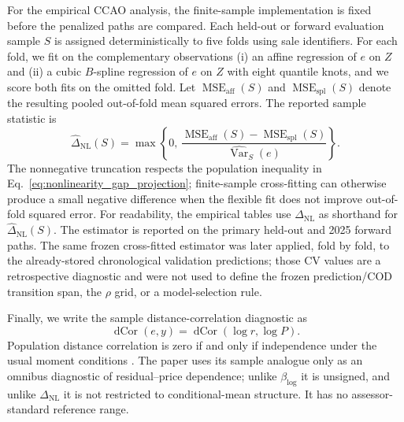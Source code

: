 \documentclass[10pt]{article}
\theoremstyle{definition}
\newcommand{\Var}{\operatorname{Var}}
\newcommand{\1}{\mathbf{1}}
\begin{document}
For the empirical CCAO analysis, the finite-sample implementation is fixed before
the penalized paths are compared. Each held-out or forward evaluation sample $S$ is
assigned deterministically to five folds using sale identifiers. For each fold, we
fit on the complementary observations (i) an affine regression of $e$ on $Z$ and
(ii) a cubic $B$-spline regression of $e$ on $Z$ with eight quantile knots, and we
score both fits on the omitted fold. Let
$\operatorname{MSE}_{\mathrm{aff}}(S)$ and
$\operatorname{MSE}_{\mathrm{spl}}(S)$ denote the resulting pooled out-of-fold mean
squared errors. The reported sample statistic is
\begin{equation}
\label{eq:nonlinearity_gap_estimator}
\widehat{\Delta}_{\mathrm{NL}}(S)
=
\max\left\{
0,\,
\frac{
\operatorname{MSE}_{\mathrm{aff}}(S)
-
\operatorname{MSE}_{\mathrm{spl}}(S)
}{
\widehat{\Var}_S(e)
}
\right\}.
\end{equation}
The nonnegative truncation respects the population inequality in
Eq.~\eqref{eq:nonlinearity_gap_projection}; finite-sample cross-fitting can otherwise
produce a small negative difference when the flexible fit does not improve
out-of-fold squared error. For readability, the empirical tables use
$\Delta_{\mathrm{NL}}$ as shorthand for
$\widehat{\Delta}_{\mathrm{NL}}(S)$. 
The estimator is reported on the primary held-out and 2025 forward paths. The same frozen cross-fitted estimator was later applied, fold by fold, to the already-stored chronological validation predictions; those CV values are a retrospective diagnostic and were not used to define the frozen prediction/COD transition span, the $\rho$ grid, or a model-selection rule.

Finally, we write the sample distance-correlation diagnostic as
\begin{equation}
\label{eq:dcor_diagnostic}
\operatorname{dCor}(e,y)=\operatorname{dCor}(\log r,\log P).
\end{equation}
Population distance correlation is zero if and only if independence under
the usual moment conditions \cite{SzekelyRizzoBakirov2007}. The paper uses its
sample analogue only as an omnibus diagnostic of residual--price dependence; unlike
$\beta_{\log}$ it is unsigned, and unlike $\Delta_{\mathrm{NL}}$ it is not restricted
to conditional-mean structure. It has no assessor-standard reference range.

\end{document}
